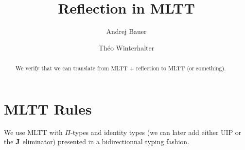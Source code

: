 \documentclass{amsart}
\begin{document}
\title{Reflection in MLTT}

\author{Andrej Bauer}
\address{Andrej Bauer\\University of Ljubljana\\Slovenia}

\author{Théo Winterhalter}
\address{Théo Winterhalter\\École normale supérieure de Cachan\\France}

\begin{abstract}
  We verify that we can translate from MLTT + reflection to MLTT (or something).
\end{abstract}

\maketitle

\section{MLTT Rules}

We use MLTT with $\Pi$-types and identity types (we can later add either UIP
or the $\operatorname{\mathbf{J}}$ eliminator) presented in a bidirectionnal typing fashion.


\begin{mathc}
  \ru{}{\der \cdot}
  \qquad
  \qquad
\end{mathc}


\begin{mathc}
  \qquad
\end{mathc}


\begin{mathc}
  \qquad
\end{mathc}
\end{document}
